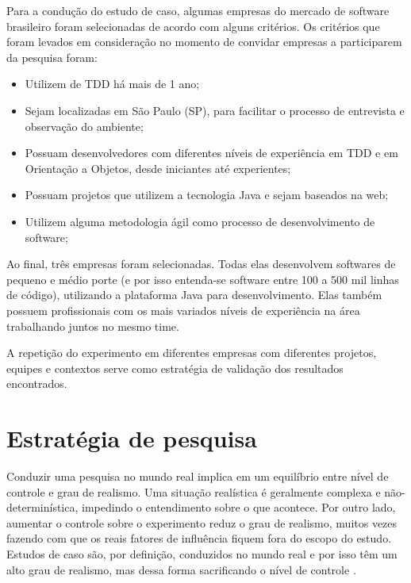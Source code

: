 Para a condução do estudo de caso, algumas empresas do mercado de software
brasileiro foram selecionadas de acordo com alguns critérios.
Os critérios que foram levados em consideração no momento de convidar empresas a
participarem da pesquisa foram:

\begin{itemize}
	\item Utilizem de TDD há mais de 1 ano;

	\item Sejam localizadas em São Paulo (SP), para facilitar o processo de
	entrevista e observação do ambiente;

	\item Possuam desenvolvedores com diferentes níveis de experiência em TDD e em 
	Orientação a Objetos, desde iniciantes até experientes;

	\item Possuam projetos que utilizem a tecnologia Java e sejam baseados na web;

	\item Utilizem alguma metodologia ágil como processo de desenvolvimento de
	software;
\end{itemize}

Ao final, três empresas foram selecionadas. Todas elas desenvolvem softwares de
pequeno e médio porte (e por isso entenda-se software entre 100 a 500 mil linhas
de código), utilizando a plataforma Java para desenvolvimento. Elas também 
possuem profissionais com os mais variados níveis de experiência na área 
trabalhando juntos no mesmo time.

A repetição do experimento em diferentes empresas com diferentes projetos,
equipes e contextos serve como estratégia de validação dos resultados
encontrados.

\section{Estratégia de pesquisa} 
\label{sec:planejamento-estrategia}

Conduzir uma pesquisa no mundo real implica em um equilíbrio entre nível de
controle e grau de realismo. Uma situação realística é geralmente complexa e 
não-determinística, impedindo o entendimento sobre o que acontece. Por outro
lado, aumentar o controle sobre o experimento reduz o grau de realismo, muitos
vezes fazendo com que os reais fatores de influência fiquem fora do escopo do 
estudo. Estudos de caso são, por definição, conduzidos no mundo real e por isso 
têm um alto grau de realismo, mas dessa forma sacrificando o nível de  controle
\cite{guidelines-case-study}.

